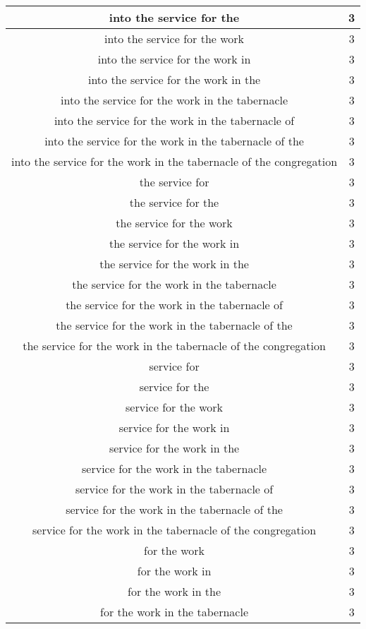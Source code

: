 \begin{center}
\begin{longtable}{|c|c|}
into the service for the & 3\\ \hline 
into the service for the work & 3\\ \hline 
into the service for the work in & 3\\ \hline 
into the service for the work in the & 3\\ \hline 
into the service for the work in the tabernacle & 3\\ \hline 
into the service for the work in the tabernacle of & 3\\ \hline 
into the service for the work in the tabernacle of the & 3\\ \hline 
into the service for the work in the tabernacle of the congregation & 3\\ \hline 
the service for & 3\\ \hline 
the service for the & 3\\ \hline 
the service for the work & 3\\ \hline 
the service for the work in & 3\\ \hline 
the service for the work in the & 3\\ \hline 
the service for the work in the tabernacle & 3\\ \hline 
the service for the work in the tabernacle of & 3\\ \hline 
the service for the work in the tabernacle of the & 3\\ \hline 
the service for the work in the tabernacle of the congregation & 3\\ \hline 
service for & 3\\ \hline 
service for the & 3\\ \hline 
service for the work & 3\\ \hline 
service for the work in & 3\\ \hline 
service for the work in the & 3\\ \hline 
service for the work in the tabernacle & 3\\ \hline 
service for the work in the tabernacle of & 3\\ \hline 
service for the work in the tabernacle of the & 3\\ \hline 
service for the work in the tabernacle of the congregation & 3\\ \hline 
for the work & 3\\ \hline 
for the work in & 3\\ \hline 
for the work in the & 3\\ \hline 
for the work in the tabernacle & 3\\ \hline 

\end{longtable}
\end{center}
